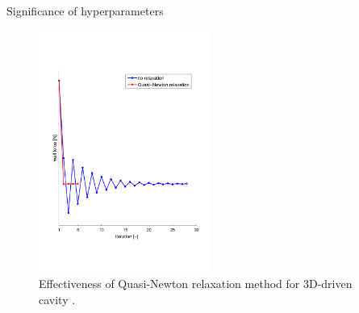 \documentclass[10pt]{beamer}
\begin{document}
\begin{frame}{Significance of hyperparameters}
\begin{figure}[!h]
\centering
\includegraphics[trim={0 3cm 0 3cm},clip,width=0.5\textwidth,height=0.65\textheight]{images/qn_relaxation_drivencavity_1.pdf}
\captionsetup{justification=justified}
\caption[Effectiveness of Quasi-Newton relaxation method for 3D-driven cavity]{Effectiveness of Quasi-Newton relaxation method for 3D-driven cavity \cite{MpCCI_documentation}.}
\label{Fig:qn_relaxation}
\end{figure}

\end{frame}
\end{document}
